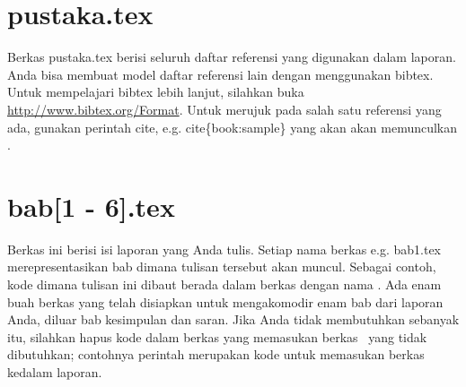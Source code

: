 \section{pustaka.tex}
Berkas pustaka.tex berisi seluruh daftar referensi yang digunakan dalam
laporan.
Anda bisa membuat model daftar referensi lain dengan menggunakan bibtex.
Untuk mempelajari bibtex lebih lanjut, silahkan buka \url{http://www.bibtex.org/Format}.
Untuk merujuk pada salah satu referensi yang ada, gunakan perintah \bslash cite, e.g. \bslash cite\{book:sample\} yang akan akan memunculkan \cite{book:sample}.


\section{bab[1 - 6].tex}
Berkas ini berisi isi laporan yang Anda tulis.
Setiap nama berkas e.g. bab1.tex merepresentasikan bab dimana tulisan tersebut akan muncul.
Sebagai contoh, kode dimana tulisan ini dibaut berada dalam berkas dengan nama .
Ada enam buah berkas yang telah disiapkan untuk mengakomodir enam bab dari laporan Anda, diluar bab kesimpulan dan saran.
Jika Anda tidak membutuhkan sebanyak itu, silahkan hapus kode dalam berkas  yang memasukan berkas \latex~yang tidak dibutuhkan; contohnya perintah  merupakan kode untuk memasukan berkas  kedalam laporan.
